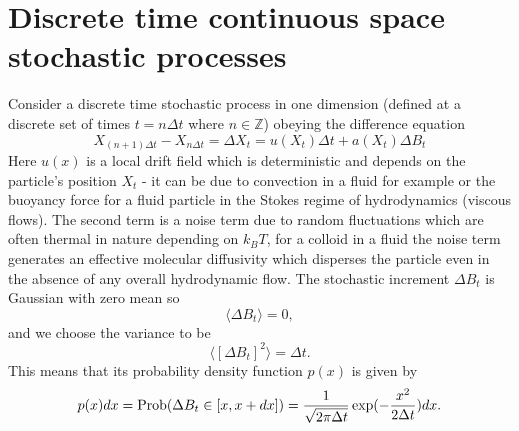 \documentclass[11pt]{report}
\begin{document}
\section{Discrete time continuous space stochastic processes}
Consider a discrete time stochastic process in one dimension (defined at a discrete set of  times $t = n\Delta t$ where $n\in \mathbb Z$) obeying the difference equation
\begin{equation}
X_{(n+1)\Delta t}-X_{n\Delta t}=\Delta X_t = u(X_t) \Delta t + a(X_t) \Delta B_t \label{sded}
\end{equation}
Here $u(x)$ is a local drift field which is deterministic and depends on the particle's position
$X_t$ - it can be due to convection in a fluid for example or the buoyancy force for a fluid particle in the Stokes regime of hydrodynamics (viscous flows). The second term is a noise term due to random fluctuations which are often thermal in nature depending on $k_BT$, for a colloid in a fluid the noise term generates an effective molecular diffusivity which disperses the particle even in the absence of any overall hydrodynamic flow.
The stochastic increment $\Delta B_t$ is Gaussian with  zero mean so
\begin{equation}
\langle \Delta B_t\rangle = 0,
\end{equation}
and we choose the variance to be
\begin{equation}
\langle [\Delta B_t]^2\rangle = \Delta t.
\end{equation}
This means that its probability density function $p(x)$ is given by
\begin{equation}
p(x) dx = {\rm Prob}(\Delta B_t \in [x,x+dx]) = {1\over \sqrt{2\pi \Delta t}}\exp(-{x^2\over 2\Delta t}) dx.
\end{equation}
\end{document}
